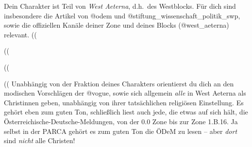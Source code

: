 Dein Charakter ist Teil von \emph{West Aeterna}, d.h.~des Westblocks. 
Für dich sind insbesondere die Artikel von
@odem und @stiftung\_wissenschaft\_politik\_swp, sowie die offiziellen Kanäle
deiner Zone und deines Blocks (@west\_aeterna) relevant.\absatz
%
((%
  
((%
  
((%
  
((%
\absatz
%
Unabhängig von der Fraktion deines Charakters orientierst du dich an den
modischen Vorschlägen der @vogue, sowie sich allgemein \emph{alle} in West
Aeterna als Christinnen geben, unabhängig von ihrer tatsächlichen religiösen
Einstellung. Es gehört eben zum guten Ton, schließlich liest auch jede, die
etwas auf sich hält, die Österreichische-Deutsche-Meldungen, von der 0.0 Zone
bis zur Zone 1.B.16. Ja selbst in der PARCA gehört es zum guten Ton die ÖDeM zu
lesen -- aber \emph{dort} sind \emph{nicht} alle Christen!

